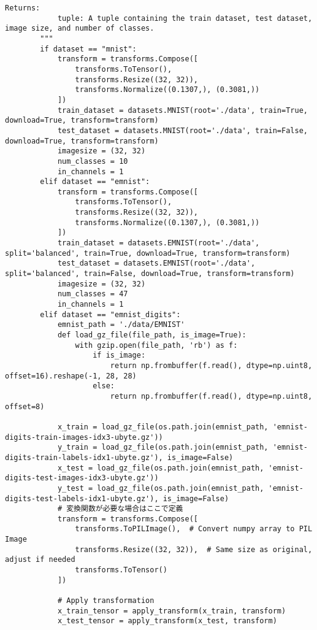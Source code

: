 \begin{lstlisting}[style=pythonstyle, caption={Program Example}]
        Returns:
            tuple: A tuple containing the train dataset, test dataset, image size, and number of classes.
        """
        if dataset == "mnist":
            transform = transforms.Compose([
                transforms.ToTensor(),
                transforms.Resize((32, 32)),
                transforms.Normalize((0.1307,), (0.3081,))
            ])
            train_dataset = datasets.MNIST(root='./data', train=True, download=True, transform=transform)
            test_dataset = datasets.MNIST(root='./data', train=False, download=True, transform=transform)
            imagesize = (32, 32)
            num_classes = 10
            in_channels = 1
        elif dataset == "emnist":
            transform = transforms.Compose([
                transforms.ToTensor(),
                transforms.Resize((32, 32)),
                transforms.Normalize((0.1307,), (0.3081,))
            ])
            train_dataset = datasets.EMNIST(root='./data', split='balanced', train=True, download=True, transform=transform)
            test_dataset = datasets.EMNIST(root='./data', split='balanced', train=False, download=True, transform=transform)
            imagesize = (32, 32)
            num_classes = 47
            in_channels = 1
        elif dataset == "emnist_digits":
            emnist_path = './data/EMNIST'
            def load_gz_file(file_path, is_image=True):
                with gzip.open(file_path, 'rb') as f:
                    if is_image:
                        return np.frombuffer(f.read(), dtype=np.uint8, offset=16).reshape(-1, 28, 28)
                    else:
                        return np.frombuffer(f.read(), dtype=np.uint8, offset=8)
    
            x_train = load_gz_file(os.path.join(emnist_path, 'emnist-digits-train-images-idx3-ubyte.gz'))
            y_train = load_gz_file(os.path.join(emnist_path, 'emnist-digits-train-labels-idx1-ubyte.gz'), is_image=False)
            x_test = load_gz_file(os.path.join(emnist_path, 'emnist-digits-test-images-idx3-ubyte.gz'))
            y_test = load_gz_file(os.path.join(emnist_path, 'emnist-digits-test-labels-idx1-ubyte.gz'), is_image=False)
            # 変換関数が必要な場合はここで定義
            transform = transforms.Compose([
                transforms.ToPILImage(),  # Convert numpy array to PIL Image
                transforms.Resize((32, 32)),  # Same size as original, adjust if needed
                transforms.ToTensor()
            ])
    
            # Apply transformation
            x_train_tensor = apply_transform(x_train, transform)
            x_test_tensor = apply_transform(x_test, transform)
    

\end{lstlisting}
